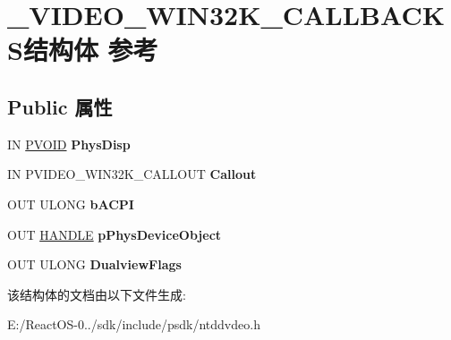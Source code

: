 \hypertarget{struct___v_i_d_e_o___w_i_n32_k___c_a_l_l_b_a_c_k_s}{}\section{\+\_\+\+V\+I\+D\+E\+O\+\_\+\+W\+I\+N32\+K\+\_\+\+C\+A\+L\+L\+B\+A\+C\+K\+S结构体 参考}
\label{struct___v_i_d_e_o___w_i_n32_k___c_a_l_l_b_a_c_k_s}
\subsection*{Public 属性}
\begin{DoxyCompactItemize}
\item 
\mbox{\label{struct___v_i_d_e_o___w_i_n32_k___c_a_l_l_b_a_c_k_s_aaad72b9a98b66939ddbcfd6f1e6d8337}} 
IN \hyperlink{interfacevoid}{P\+V\+O\+ID} {\bfseries Phys\+Disp}
\item 
\mbox{\label{struct___v_i_d_e_o___w_i_n32_k___c_a_l_l_b_a_c_k_s_a2dd6bf5a284f87cb3889544a1633a12e}} 
IN P\+V\+I\+D\+E\+O\+\_\+\+W\+I\+N32\+K\+\_\+\+C\+A\+L\+L\+O\+UT {\bfseries Callout}
\item 
\mbox{\label{struct___v_i_d_e_o___w_i_n32_k___c_a_l_l_b_a_c_k_s_a7d4a24437e6945b360131c458533fbe9}} 
O\+UT U\+L\+O\+NG {\bfseries b\+A\+C\+PI}
\item 
\mbox{\label{struct___v_i_d_e_o___w_i_n32_k___c_a_l_l_b_a_c_k_s_ac06d63931524873a3a82c8ae144b9cac}} 
O\+UT \hyperlink{interfacevoid}{H\+A\+N\+D\+LE} {\bfseries p\+Phys\+Device\+Object}
\item 
\mbox{\label{struct___v_i_d_e_o___w_i_n32_k___c_a_l_l_b_a_c_k_s_a0b9a857b735c1172bfa15c22cb10d47f}} 
O\+UT U\+L\+O\+NG {\bfseries Dualview\+Flags}
\end{DoxyCompactItemize}


该结构体的文档由以下文件生成\+:\begin{DoxyCompactItemize}
\item 
E\+:/\+React\+O\+S-\/0../sdk/include/psdk/ntddvdeo.\+h\end{DoxyCompactItemize}
